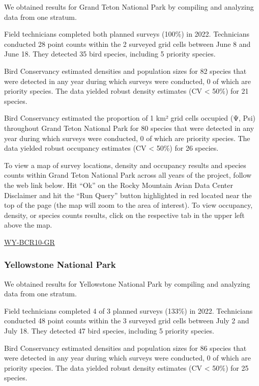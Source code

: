 \documentclass[
  letterpaper,
  DIV=11,
  numbers=noendperiod,
  oneside]{scrreprt}
\begin{document}
We obtained results for Grand Teton National Park by compiling and
analyzing data from one stratum.

Field technicians completed both planned surveys (100\%) in 2022.
Technicians conducted 28 point counts within the 2 surveyed grid cells
between June 8 and June 18. They detected 35 bird species, including 5
priority species.

Bird Conservancy estimated densities and population sizes for 82 species
that were detected in any year during which surveys were conducted, 0 of
which are priority species. The data yielded robust density estimates
(CV \textless{} 50\%) for 21 species.

Bird Conservancy estimated the proportion of 1 km² grid cells occupied
(Ψ, Psi) throughout Grand Teton National Park for 80 species that were
detected in any year during which surveys were conducted, 0 of which are
priority species. The data yielded robust occupancy estimates (CV
\textless{} 50\%) for 26 species.

To view a map of survey locations, density and occupancy results and
species counts within Grand Teton National Park across all years of the
project, follow the web link below. Hit ``Ok'' on the Rocky Mountain
Avian Data Center Disclaimer and hit the ``Run Query'' button
highlighted in red located near the top of the page (the map will zoom
to the area of interest). To view occupancy, density, or species counts
results, click on the respective tab in the upper left above the map.

\href{http://www.rmbo.org/new_site/adc/QueryWindow.aspx\#N4IgzgLgTghhCuBbEAuABCA6gTQLQCEBhAJQEYAGXAcWPStgDsATNAFQFMIB7BtAOTgBLHjAA2aAAowoAaxABfIA}{WY-BCR10-GR}

\hypertarget{yellowstone-national-park}{%
\subsubsection{Yellowstone National
Park}\label{yellowstone-national-park}}

We obtained results for Yellowstone National Park by compiling and
analyzing data from one stratum.

Field technicians completed 4 of 3 planned surveys (133\%) in 2022.
Technicians conducted 48 point counts within the 3 surveyed grid cells
between July 2 and July 18. They detected 47 bird species, including 5
priority species.

Bird Conservancy estimated densities and population sizes for 86 species
that were detected in any year during which surveys were conducted, 0 of
which are priority species. The data yielded robust density estimates
(CV \textless{} 50\%) for 25 species.
\end{document}
